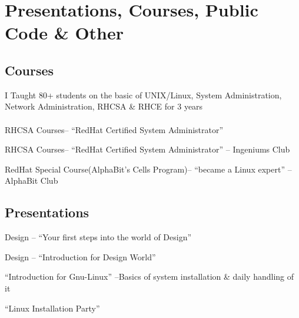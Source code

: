 \documentclass{cv}
\begin{document}
\section{Presentations, Courses, Public Code \& Other}
\subsection{Courses}
\label{sec:class}
I Taught 80+ students on the basic of UNIX/Linux, System Administration, Network Administration, RHCSA \& RHCE for 3 years\\\\
    {RHCSA Courses-- ``RedHat Certified System Administrator''}
    {\esi}

    {RHCSA Courses-- ``RedHat Certified System Administrator''}
    {\esi -- Ingeniums Club}

    {RedHat Special Course(AlphaBit's Cells Program)-- ``became a Linux expert''}
    {\esi -- AlphaBit Club}

\subsection{Presentations}
    {Design -- ``Your first steps into the world of Design''}
    {\med}

    {Design -- ``Introduction for Design World''}
    {\esi}

    {``Introduction for Gnu-Linux'' --Basics of system installation \& daily handling of it
    \href {https://github.com/kebairia/My_Presentations/blob/master/intro_linux} {\gh}}
    {\med}

        {``Linux Installation Party''}
    {\med}
\end{document}

